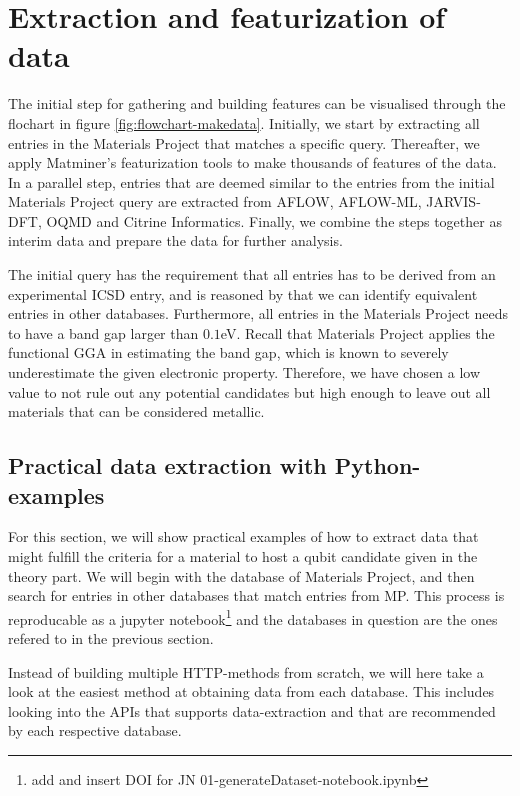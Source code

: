 \chapter{Extraction and featurization of data}

The initial step for gathering and building features can be visualised through the flochart in figure \ref{fig:flowchart-makedata}. Initially, we start by extracting all entries in the Materials Project that matches a specific query. Thereafter, we apply Matminer's featurization tools to make thousands of features of the data. In a parallel step, entries that are deemed similar to the entries from the initial Materials Project query are extracted from AFLOW, AFLOW-ML, JARVIS-DFT, OQMD and Citrine Informatics. Finally, we combine the steps together as interim data and prepare the data for further analysis.



The initial query has the requirement that all entries has to be derived from an experimental ICSD entry, and is reasoned by that we can identify equivalent entries in other databases. Furthermore, all entries in the Materials Project needs to have a band gap larger than $0.1$eV. Recall that Materials Project applies the functional GGA in estimating the band gap, which is known to severely underestimate the given electronic property. Therefore, we have chosen a low value to not rule out any potential candidates but high enough to leave out all materials that can be considered metallic.

\section{Practical data extraction with Python-examples}

For this section, we will show practical examples of how to extract data that might fulfill the criteria for a material to host a qubit candidate given in the theory part. We will begin with the database of Materials Project, and then search for entries in other databases that match entries from MP. This process is reproducable as a jupyter notebook\footnote{add and insert DOI for JN 01-generateDataset-notebook.ipynb} and the databases in question are the ones refered to in the previous section.

Instead of building multiple HTTP-methods from scratch, we will here take a look at the easiest method at obtaining data from each database. This includes looking into the APIs that supports data-extraction and that are recommended by each respective database.

